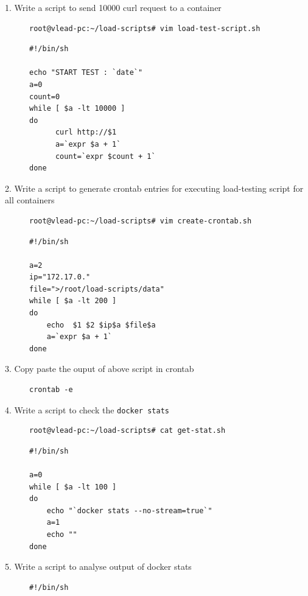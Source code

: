 \documentclass[11pt]{article}
\begin{document}
\begin{description}
\item[{1. Write a script to send 10000 curl request to a container}] \begin{verbatim}
root@vlead-pc:~/load-scripts# vim load-test-script.sh
\end{verbatim}

\begin{verbatim}
#!/bin/sh

echo "START TEST : `date`"
a=0
count=0
while [ $a -lt 10000 ]
do
      curl http://$1
      a=`expr $a + 1`
      count=`expr $count + 1`
done
\end{verbatim}
\item[{2. Write a script to generate crontab entries for executing load-testing script for all containers}] \begin{verbatim}
root@vlead-pc:~/load-scripts# vim create-crontab.sh
\end{verbatim}
\begin{verbatim}
#!/bin/sh

a=2
ip="172.17.0."
file=">/root/load-scripts/data"
while [ $a -lt 200 ]
do
    echo  $1 $2 $ip$a $file$a
    a=`expr $a + 1`
done
\end{verbatim}
\item[{3. Copy paste the ouput of above script in crontab}] \begin{verbatim}
crontab -e
\end{verbatim}

\item[{4. Write a script to check the \texttt{docker stats}}] \begin{verbatim}
root@vlead-pc:~/load-scripts# cat get-stat.sh
\end{verbatim}

\begin{verbatim}
#!/bin/sh

a=0
while [ $a -lt 100 ]
do
    echo "`docker stats --no-stream=true`"
    a=1
    echo ""
done
\end{verbatim}
\item[{5. Write a script to analyse output of docker stats}] \begin{verbatim}
#!/bin/sh


\end{verbatim}
\end{description}
\end{document}
